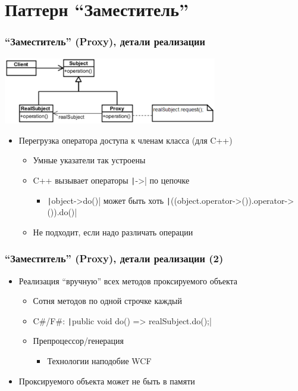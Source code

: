 \documentclass[xetex,mathserif,serif]{beamer}
\begin{document}
	\section{Паттерн ``Заместитель''}

	\begin{frame}
		\frametitle{``Заместитель'' (Proxy), детали реализации}
		\begin{center}
			\includegraphics[width=0.7\textwidth]{proxy.png}
		\end{center}
		\begin{itemize}
			\item Перегрузка оператора доступа к членам класса (для C++)
			\begin{itemize}
				\item Умные указатели так устроены
				\item C++ вызывает операторы \texttt|->| по цепочке
				\begin{itemize}
					\item \texttt|object->do()| может быть хоть \texttt|((object.operator->()).operator->()).do()|
				\end{itemize}
				\item Не подходит, если надо различать операции
			\end{itemize}
		\end{itemize}
	\end{frame}

	\begin{frame}
		\frametitle{``Заместитель'' (Proxy), детали реализации (2)}
		\begin{itemize}
			\item Реализация ``вручную'' всех методов проксируемого объекта
			\begin{itemize}
				\item Сотня методов по одной строчке каждый
				\item C\#/F\#: \texttt|public void do() => realSubject.do();|
				\item Препроцессор/генерация
				\begin{itemize}
					\item Технологии наподобие WCF
				\end{itemize}
			\end{itemize}
			\item Проксируемого объекта может не быть в памяти
		\end{itemize}
	\end{frame}
\end{document}
